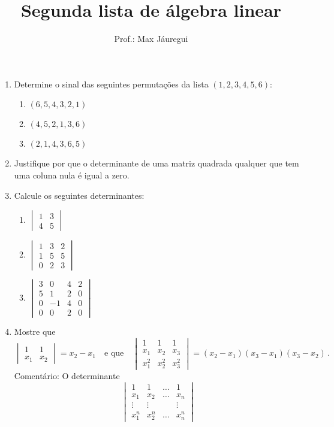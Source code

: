 \documentclass[12pt,a4paper]{article}
\title{Segunda lista de álgebra linear}
\author{Prof.: Max Jáuregui}
\date{}
\begin{document}
\maketitle
\begin{enumerate}
\item Determine o sinal das seguintes permutações da lista $(1,2,3,4,5,6)$:
\begin{enumerate}
\item $(6,5,4,3,2,1)$
\item $(4,5,2,1,3,6)$
\item $(2,1,4,3,6,5)$
\end{enumerate}
\item Justifique por que o determinante de uma matriz quadrada qualquer que tem uma coluna nula é igual a zero.
\item Calcule os seguintes determinantes:
\begin{enumerate}
\item $\begin{vmatrix}1&3\\4&5\end{vmatrix}$
\item $\begin{vmatrix}1&3&2\\1&5&5\\0&2&3\end{vmatrix}$
\item $\begin{vmatrix}3&0&4&2\\5&1&2&0\\0&-1&4&0\\0&0&2&0\end{vmatrix}$
\end{enumerate}
\item Mostre que
$$\begin{vmatrix}1&1\\x_1&x_2\end{vmatrix}=x_2-x_1\quad \text{e que}\quad\begin{vmatrix}1&1&1\\x_1&x_2&x_3\\x_1^2&x_2^2&x_3^2\end{vmatrix}=(x_2-x_1)(x_3-x_1)(x_3-x_2)\,.$$
Comentário: O determinante
$$\begin{vmatrix}1&1&\ldots&1\\x_1&x_2&\ldots&x_n\\\vdots&\vdots&&\vdots\\x_1^n&x_2^n&\ldots&x_n^n\end{vmatrix}$$

\end{enumerate}
\end{document}
